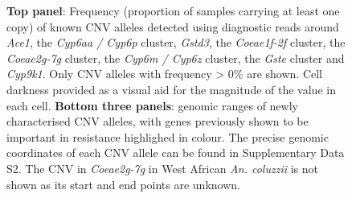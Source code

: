 \documentclass[a4paper,12pt]{article}
\begin{document}
\begin{figure}[h]
	\begin{center}
		\vskip 1cm
		\vskip 1cm
		\vskip 1cm
	\end{center}
	\caption{\footnotesize \textbf{Top panel}: Frequency (proportion of samples carrying at least one copy) of known CNV alleles detected using diagnostic reads around \textit{Ace1}, the \textit{Cyp6aa / Cyp6p} cluster, \textit{Gstd3}, the \textit{Coeae1f-2f} cluster, the \textit{Coeae2g-7g} cluster, the \textit{Cyp6m / Cyp6z} cluster, the \textit{Gste} cluster and \textit{Cyp9k1}. Only CNV alleles with frequency > 0\% are shown. Cell darkness provided as a visual aid for the magnitude of the value in each cell. \textbf{Bottom three panels}: genomic ranges of newly characterised CNV alleles, with genes previously shown to be important in resistance highlighed in colour. The precise genomic coordinates of each CNV allele can be found in Supplementary Data S2. The CNV in \textit{Coeae2g-7g} in West African \textit{An. coluzzii} is not shown as its start and end points are unknown.}
	\label{FigS5}
\end{figure}
\end{document}
